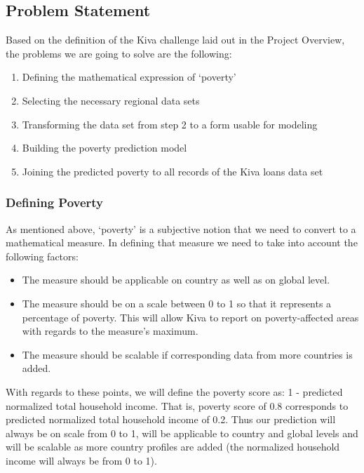 \documentclass{article}
\begin{document}
\hypertarget{prob_statement}{\subsection{Problem Statement}}
Based on the definition of the Kiva challenge laid out in the Project Overview, the problems we are going to solve are the following:
\begin{enumerate}
  \item Defining the mathematical expression of ‘poverty’
  \item Selecting the necessary regional data sets
  \item Transforming the data set from step 2 to a form usable for modeling
  \item Building the poverty prediction model
  \item Joining the predicted poverty to all records of the Kiva loans data set
\end{enumerate}
\subsubsection{Defining Poverty}
As mentioned above, ‘poverty’ is a subjective notion that we need to convert to a mathematical measure. In defining that measure we need to take into account the following factors:
\begin{itemize}
  \item The measure should be applicable on country as well as on global level.
  \item The measure should be on a scale between 0 to 1 so that it represents a percentage of poverty. This will allow Kiva to report on poverty-affected areas with regards to the measure’s maximum.
  \item The measure should be scalable if corresponding data from more countries is added.
\end{itemize}
With regards to these points, we will define the poverty score as: 1 - predicted normalized total household income. That is, poverty score of 0.8 corresponds to predicted normalized total household income of 0.2. Thus our prediction will always be on scale from 0 to 1, will be applicable to country and global levels and will be scalable as more country profiles are added (the normalized household income will always be from 0 to 1).
\end{document}
